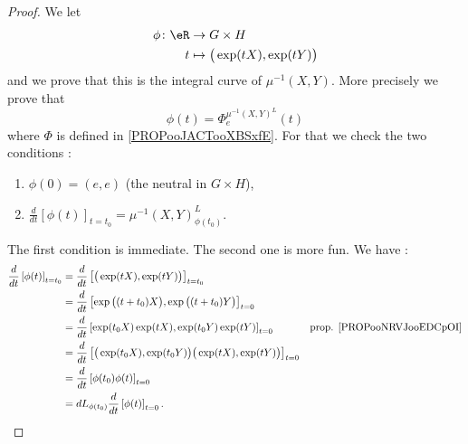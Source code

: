 \begin{proof}
	We let
	\begin{equation}
		\begin{aligned}
			\phi\colon \eR & \to G\times H                         \\
			t              & \mapsto \big( \exp(tX),\exp(tY) \big)
		\end{aligned}
	\end{equation}
	and we prove that this is the integral curve of \( \mu^{-1}(X,Y)\). More precisely we prove that
	\begin{equation}
		\phi(t)=\Phi_e^{\mu^{-1}(X,Y)^L}(t)
	\end{equation}
	where \( \Phi\) is defined in \ref{PROPooJACTooXBSxfE}. For that we check the two conditions :
	\begin{enumerate}
		\item
		      \( \phi(0)=(e,e)\) (the neutral in \( G\times H\)),
		\item
		      \( \frac{d}{dt} \left[ \phi(t)  \right]_{t=t_0}=\mu^{-1}(X,Y)^L_{\phi(t_0)}\).
	\end{enumerate}
	The first condition is immediate. The second one is more fun. We have :
	\begin{subequations}	\label{EQooNEUVooIzLeWx}
		\begin{align}
			\frac{d}{dt} \left[ \phi(t)  \right]_{t=t_0} & =\frac{d}{dt} \left[ \big( \exp(tX),\exp(tY) \big)  \right]_{t=t_0}                                                                        \\
			                                             & =\frac{d}{dt} \left[ \exp\big( (t+t_0)X \big),\exp\big( (t+t_0)Y \big)  \right]_{t=0}                                                      \\
			                                             & =\frac{d}{dt} \left[ \exp(t_0X)\exp(tX),\exp(t_0Y)\exp(tY)  \right]_{t=0}                          & \text{prop. \ref{PROPooNRVJooEDCpOI}} \\
			                                             & =\frac{d}{dt} \left[ \big( \exp(t_0X),\exp(t_0Y) \big)\big( \exp(tX),\exp(tY) \big)  \right]_{t=0}                                         \\
			                                             & =\frac{d}{dt} \left[ \phi(t_0)\phi(t)  \right]_{t=0}                                                                                       \\
			                                             & =dL_{\phi(t_0)}\frac{d}{dt} \left[ \phi(t)  \right]_{t=0}.
		\end{align}
	\end{subequations}


\end{proof}
